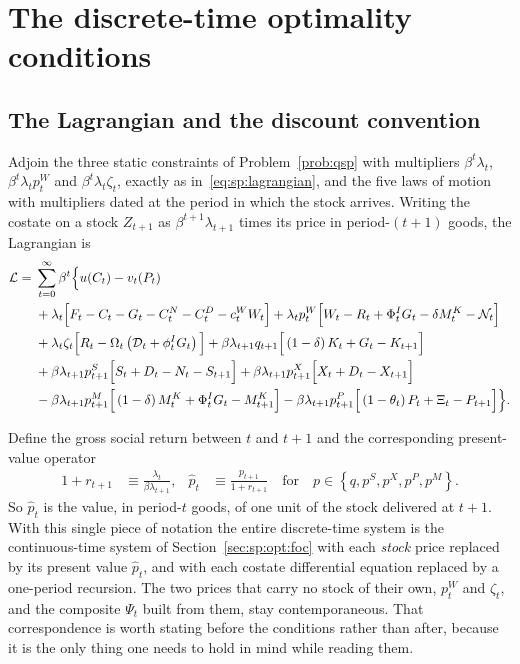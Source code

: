 \section{The discrete-time optimality conditions}\label{sec:qsp:model}

\subsection{The Lagrangian and the discount convention}\label{sec:qsp:model:lagrangian}

Adjoin the three static constraints of Problem~\ref{prob:qsp} with multipliers $\beta^t\lambda_t$,
$\beta^t\lambda_tp^W_t$ and $\beta^t\lambda_t\zeta_t$, exactly as in~\eqref{eq:sp:lagrangian}, and the
five laws of motion with multipliers dated at the period in which the stock arrives. Writing the
costate on a stock $Z_{t+1}$ as $\beta^{t+1}\lambda_{t+1}$ times its price in period-$\left(t+1\right)$
goods, the Lagrangian is
\begin{align}
\mathcal L
={}&\sum_{t=0}^\infty\beta^t\Big\{u\!\left(C_t\right)-v_t\!\left(P_t\right)
\notag\\
&+\lambda_t\Big[F_t-C_t-G_t-C^N_t-C^D_t-c^W_tW_t\Big]
+\lambda_tp^W_t\Big[W_t-R_t+\Phi^I_tG_t-\delta M^K_t-\mathcal N_t\Big]
\notag\\
&+\lambda_t\zeta_t\Big[R_t-\Omega_t\left(\mathcal D_t+\phi^I_tG_t\right)\Big]
+\beta\lambda_{t+1}q_{t+1}\Big[\left(1-\delta\right)K_t+G_t-K_{t+1}\Big]
\notag\\
&+\beta\lambda_{t+1}p^S_{t+1}\Big[S_t+D_t-N_t-S_{t+1}\Big]
+\beta\lambda_{t+1}p^X_{t+1}\Big[X_t+D_t-X_{t+1}\Big]
\notag\\
&-\beta\lambda_{t+1}p^M_{t+1}\Big[\left(1-\delta\right)M^K_t+\Phi^I_tG_t-M^K_{t+1}\Big]
-\beta\lambda_{t+1}p^P_{t+1}\Big[\left(1-\theta_t\right)P_t+\Xi_t-P_{t+1}\Big]\Big\}.
\label{eq:qsp:lagrangian}
\end{align}

 Define the gross social return between $t$ and
$t+1$ and the corresponding present-value operator
\begin{align}
1+r_{t+1} &\equiv \frac{\lambda_t}{\beta\lambda_{t+1}},
&
\hat p_t &\equiv \frac{p_{t+1}}{1+r_{t+1}}
\quad\text{for}\quad p\in\left\{q,p^S,p^X,p^P,p^M\right\}.
\label{eq:qsp:discount}
\end{align}
So $\hat p_t$ is the value, in period-$t$ goods, of one unit of the stock delivered at $t+1$. With this
single piece of notation the entire discrete-time system is the continuous-time system of
Section~\ref{sec:sp:opt:foc} with each \emph{stock} price replaced by its present value $\hat p_t$, and
with each costate differential equation replaced by a one-period recursion. The two prices that carry
no stock of their own, $p^W_t$ and $\zeta_t$, and the composite $\Psi_t$ built from them, stay
contemporaneous. That correspondence is worth stating before the conditions rather than after, because
it is the only thing one needs to hold in mind while reading them.

